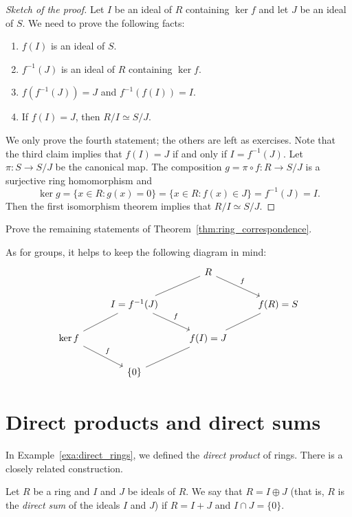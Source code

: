 \begin{proof}[Sketch of the proof]
Let $I$ be an ideal of $R$ containing $\ker f$ and
let $J$ be an ideal of $S$. 
We need to prove the following facts:
\begin{enumerate}
\item $f(I)$ is an ideal of $S$.
\item $f^{-1}(J)$ is an ideal of $R$ containing $\ker f$. 
\item $f(f^{-1}(J))=J$ and $f^{-1}(f(I))=I$. 
\item If $f(I)=J$, then $R/I\simeq S/J$. 
\end{enumerate}
We only prove the fourth statement; the others are left as exercises. Note that
the third claim implies that $f(I)=J$ if and only if $I=f^{-1}(J)$. 
Let 
$\pi\colon S\to S/J$ be the canonical map. The composition
$g=\pi\circ f\colon R\to S/J$ is a surjective ring homomorphism and
\[
\ker g=\{x\in R:g(x)=0\}=\{x\in R:f(x)\in J\}=f^{-1}(J)=I.
\]
Then the first isomorphism theorem implies that $R/I\simeq S/J$.
\end{proof}

\begin{exercise}
    Prove the remaining statements of Theorem~\ref{thm:ring_correspondence}.
\end{exercise}

As for groups, it helps to keep the following diagram in mind:
\[
\begin{tikzcd}
        && R \\
        & I=f^{-1}(J) && f(R)=S \\
        \ker f && f(I)=J \\
        & {\{0\}}
        \arrow["f", from=1-3, to=2-4]
        \arrow[no head, from=1-3, to=2-2]
        \arrow[no head, from=2-2, to=3-1]
        \arrow["f", from=3-1, to=4-2]
        \arrow["f", from=2-2, to=3-3]
        \arrow[no head, from=3-3, to=4-2]
        \arrow[no head, from=2-4, to=3-3]
\end{tikzcd}
\]

\section{Direct products and direct sums}

In Example~\ref{exa:direct_rings}, we defined the \emph{direct product} of
rings. There is a closely related construction.

\begin{definition}
\label{def:direct_ideals}
Let $R$ be a ring and $I$ and $J$ be ideals of $R$. We say that 
$R=I\oplus J$ (that is, $R$ is the \emph{direct sum} of the ideals $I$ and $J$) 
if $R=I+J$ and $I\cap J=\{0\}$.  
\end{definition}

